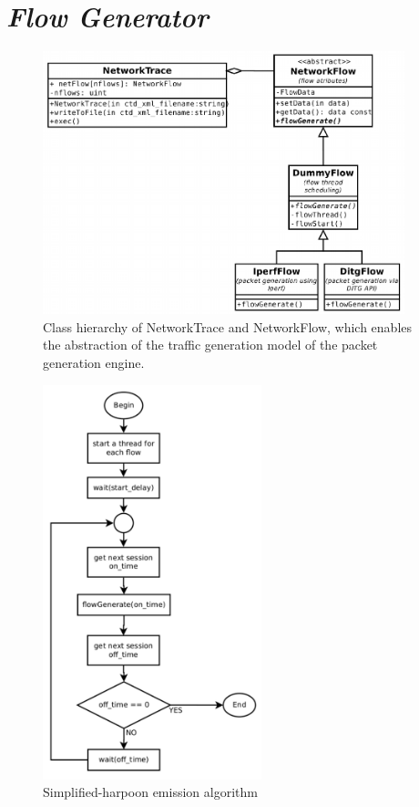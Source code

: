 \section{ \textit{Flow Generator} }

\begin{figure}[ht!]
    \centering
    \includegraphics[height=3.0in]{figures/ch3/trace-flow}
    \caption{Class hierarchy of NetworkTrace and NetworkFlow, which enables the abstraction of the traffic generation model of the packet generation engine.}
    \label{fig:network-trace-flow-class-diagram}
\end{figure}

\begin{figure}[ht!]
    \centering
    \includegraphics[height=4.5in]{figures/ch3/alg-simplified-harpoon}
    \caption{Simplified-harpoon emission algorithm}
    \label{fig:alg-simplified-harpoon}
\end{figure}


